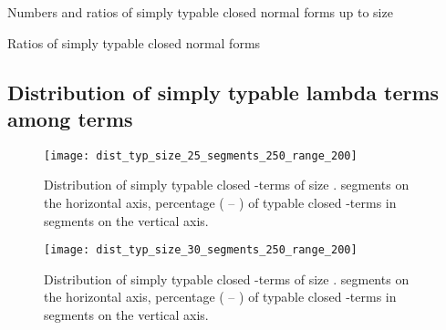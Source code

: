 \documentclass{jfp1}
\begin{document}
\begin{table}[htb!]
  \centering
  
  \caption{Numbers and ratios of simply typable closed normal forms up to size }
\label{tab:nfUpToSeven}
\end{table}
\begin{table*}[htb!]
  \centering
  

  \caption{Ratios of simply typable closed normal forms}
\label{tab:ratioNF}
\end{table*}

\subsection{Distribution of simply typable lambda terms among terms}

\begin{figure}[htb!]
  \centering
   \texttt{[image: dist\_typ\_size\_25\_segments\_250\_range\_200]}
\ifJFP
\else
\\\centerline{}
\fi
  \caption{Distribution of simply typable closed -terms of size \textbf{}.  segments on the
    horizontal axis, percentage ( -- ) of typable closed -terms in segments on the vertical axis.}
  \label{fig:dist_typed_size_25}
\end{figure}

\begin{figure}[htb!]
  \centering
   \texttt{[image: dist\_typ\_size\_30\_segments\_250\_range\_200]}
 \ifJFP
\else
\\\centerline{}
\fi
\caption{Distribution of simply typable closed -terms of size
  \textbf{}.  segments on the horizontal axis, percentage ( -- )
  of typable closed -terms in segments on the vertical axis.}
  \label{fig:dist_typed_size_30}
\end{figure}
\end{document}

